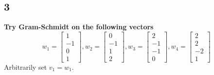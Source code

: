 \documentclass[10pt,letterpaper]{article}
\begin{document}
	\subsection*{3} \textbf{Try Gram-Schmidt on the following vectors}
	$$
	w_1 = 
	\begin{bmatrix}
	1 \\ -1 \\ 0 \\1
	\end{bmatrix},w_2 =  \begin{bmatrix}
	0 \\ -1 \\ 1 \\ 2
	\end{bmatrix}, w_3 = \begin{bmatrix}
	2 \\ -1 \\ -1 \\ 0
	\end{bmatrix}, w_4 = \begin{bmatrix}
	2 \\ 2 \\ -2 \\ 1
	\end{bmatrix}
	$$
	Arbitrarily set $v_1 = w_1$. 
	
\end{document}
